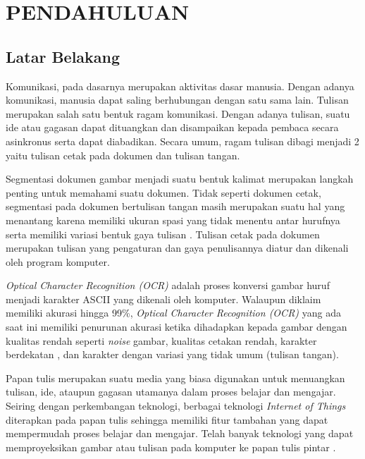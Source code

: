 
\chapter{PENDAHULUAN}
\label{chap:pendahuluan}


\section{Latar Belakang}
\label{sec:latarbelakang}

Komunikasi, pada dasarnya merupakan aktivitas dasar manusia. Dengan adanya komunikasi, manusia dapat saling berhubungan dengan satu sama lain. Tulisan merupakan salah satu bentuk ragam komunikasi. Dengan adanya tulisan, suatu ide atau gagasan dapat dituangkan dan disampaikan kepada pembaca secara asinkronus serta dapat diabadikan. Secara umum, ragam tulisan dibagi menjadi 2 yaitu tulisan cetak pada dokumen dan tulisan tangan.\par
Segmentasi dokumen gambar menjadi suatu bentuk kalimat merupakan langkah penting untuk memahami suatu dokumen. Tidak seperti dokumen cetak, segmentasi pada dokumen bertulisan tangan masih merupakan suatu hal yang menantang karena memiliki ukuran spasi yang tidak menentu antar hurufnya serta memiliki variasi bentuk gaya tulisan \citep*{ryu2015word}. Tulisan cetak pada dokumen merupakan tulisan yang pengaturan dan gaya penulisannya diatur dan dikenali oleh program komputer.\par
\textit{Optical Character Recognition (OCR)} adalah proses konversi gambar huruf menjadi karakter ASCII yang dikenali oleh komputer. Walaupun diklaim memiliki akurasi hingga 99\%, \textit{Optical Character Recognition (OCR)} yang ada saat ini memiliki penurunan akurasi ketika dihadapkan kepada gambar dengan kualitas rendah seperti \textit{noise} gambar, kualitas cetakan rendah, karakter berdekatan \citep*{ImageMalu2001approachtch}, dan karakter dengan variasi yang tidak umum (tulisan tangan).\par
Papan tulis merupakan suatu media yang biasa digunakan untuk menuangkan tulisan, ide, ataupun gagasan utamanya dalam proses belajar dan mengajar. Seiring dengan perkembangan teknologi, berbagai teknologi \textit{Internet of Things} diterapkan pada papan tulis sehingga memiliki fitur tambahan yang dapat mempermudah proses belajar dan mengajar. Telah banyak teknologi yang dapat memproyeksikan gambar atau tulisan pada komputer ke papan tulis pintar \citep*{kellerman2018smart}. 



